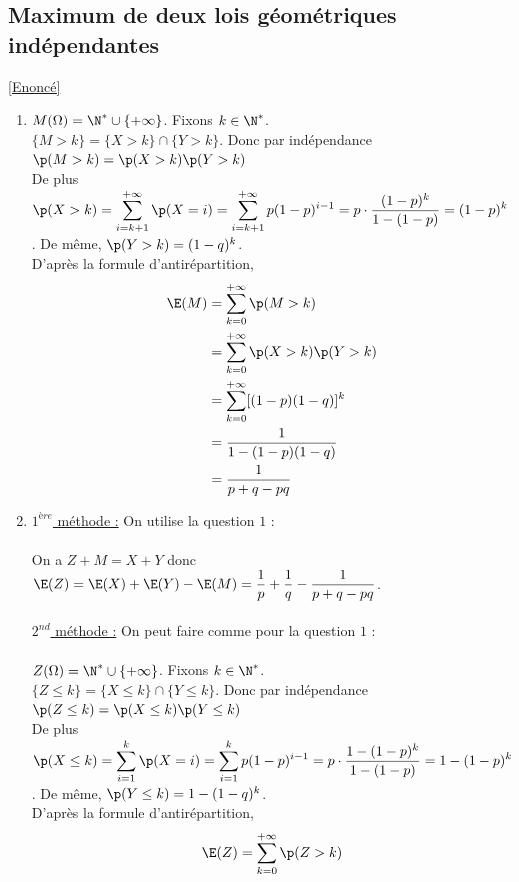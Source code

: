 \documentclass[8pt]{book}
\begin{document}
	\subsection{Maximum de deux lois géométriques indépendantes }
	\label{Maximum de deux lois géométriques indépendantes corrigé}
	\textcolor{blue}{\hyperref[Maximum de deux lois géométriques indépendantes]{[Enoncé]}}\\
	\begin{enumerate}
		\item $M(\Omega)=\N^*\cup\{+\infty\}$. Fixons $k\in \N^*$.\\
		$\{M>k\}=\{X>k\}\cap\{Y>k\}$. Donc par indépendance $\p(M>k)=\p(X>k)\p(Y>k)$\\
		De plus $\p(X>k)=\displaystyle\sum\limits_{i=k+1}^{+\infty}\p(X=i)=\sum\limits_{i=k+1}^{+\infty}p(1-p)^{i-1}=p\cdot\frac{(1-p)^k}{1-(1-p)}=(1-p)^k$. De même, $\p(Y>k)=(1-q)^k$.\\
		D'après la formule d'antirépartition,
		\begin{align*}
			\E(M)&=\sum\limits_{k=0}^{+\infty}\p(M>k)\\
			&=\sum\limits_{k=0}^{+\infty}\p(X>k)\p(Y>k)\\
			&=\sum\limits_{k=0}^{+\infty}[(1-p)(1-q)]^k\\
			&=\frac{1}{1-(1-p)(1-q)}\\
			&=\frac{1}{p+q-pq}
		\end{align*}
		\item \underline{$1^{ère}$ méthode :} On utilise la question $1$ :\\\\
		On a $Z+M=X+Y$ donc $\E(Z)=\E(X)+\E(Y)-\E(M)=\displaystyle\frac{1}{p}+\frac{1}{q}-\frac{1}{p+q-pq}$.\\\\
		\underline{$2^{nd}$ méthode :} On peut faire comme pour la question $1$ :\\\\
		$Z(\Omega)=\N^*\cup\{+\infty\}$. Fixons $k\in \N^*$.\\
		$\{Z\leq k\}=\{X\leq k\}\cap\{Y\leq k\}$. Donc par indépendance $\p(Z\leq k)=\p(X\leq k)\p(Y\leq k)$\\
		De plus $\p(X\leq k)=\displaystyle\sum\limits_{i=1}^k\p(X=i)=\sum\limits_{i=1}^kp(1-p)^{i-1}=p\cdot\frac{1-(1-p)^k}{1-(1-p)}=1-(1-p)^k$. De même, $\p(Y\leq k)=1-(1-q)^k$.\\
		D'après la formule d'antirépartition,
		\begin{align*}
			\E(Z)&=\sum\limits_{k=0}^{+\infty}\p(Z>k)\\

\end{align*}
\end{enumerate}
\end{document}
